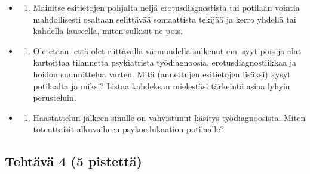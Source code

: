 \documentclass[
]{book}
\providecommand{\tightlist}{%
  \setlength{\itemsep}{0pt}\setlength{\parskip}{0pt}}
\begin{document}
\begin{itemize}
\tightlist
\item
  \begin{enumerate}
  \def\labelenumi{\alph{enumi})}
  \tightlist
  \item
    Mainitse esitietojen pohjalta neljä erotusdiagnostista tai potilaan vointia mahdollisesti osaltaan selittävää somaattista tekijää ja kerro yhdellä tai kahdella lauseella, miten sulkisit ne pois.
  \end{enumerate}
\item
  \begin{enumerate}
  \def\labelenumi{\alph{enumi})}
  \setcounter{enumi}{1}
  \tightlist
  \item
    Oletetaan, että olet riittävällä varmuudella sulkenut em. syyt pois ja alat kartoittaa tilannetta psykiatrista työdiagnoosia, erotusdiagnostiikkaa ja hoidon suunnittelua varten. Mitä (annettujen esitietojen lisäksi) kysyt potilaalta ja miksi? Listaa kahdeksan mielestäsi tärkeintä asiaa lyhyin perusteluin.
  \end{enumerate}
\item
  \begin{enumerate}
  \def\labelenumi{\alph{enumi})}
  \setcounter{enumi}{2}
  \tightlist
  \item
    Haastattelun jälkeen sinulle on vahvistunut käsitys työdiagnoosista. Miten toteuttaisit alkuvaiheen psykoedukaation potilaalle?
  \end{enumerate}
\end{itemize}

\subsection{Tehtävä 4 (5 pistettä)}\label{tehtuxe4vuxe4-4-5-pistettuxe4}
\end{document}
